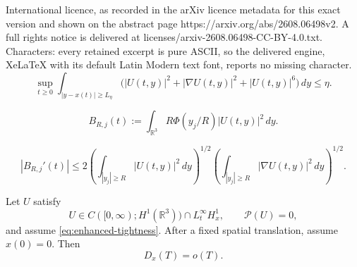 \documentclass[10pt,a4paper]{amsart}
\newcommand{\Pcal}{\mathcal P}
\newcommand{\R}{\mathbb R}
\newcommand{\dd}{\,d}
\begin{document}
International licence, as recorded in the arXiv licence metadata for this exact version and shown on the abstract page https://arxiv.org/abs/2608.06498v2. A full rights notice is delivered at licenses/arxiv-2608.06498-CC-BY-4.0.txt. Characters: every retained excerpt is pure ASCII, so the delivered engine, XeLaTeX with its default Latin Modern text font, reports no missing character.
\begin{equation}\label{eq:enhanced-tightness}
  \sup_{t\ge0}
  \int_{|y-x(t)|\ge L_\eta}
  \bigl(|U(t,y)|^2+|\nabla U(t,y)|^2+|U(t,y)|^6\bigr)\dd y
  \le\eta.
\end{equation}

\begin{equation}\label{eq:localized-center-mass}
  B_{R,j}(t):=\int_{\R^3}R\Phi(y_j/R)|U(t,y)|^2\dd y.
\end{equation}

\begin{equation}\label{eq:Bprime-tail}
  |B_{R,j}'(t)|
  \le2
  \left(\int_{|y_j|\ge R}|U(t,y)|^2\dd y\right)^{1/2}
  \left(\int_{|y_j|\ge R}|\nabla U(t,y)|^2\dd y\right)^{1/2}.
\end{equation}

\begin{lemma}\label{lem:sublinear-drift}
Let $U$ satisfy
\begin{equation*}
  U\in C([0,\infty);H^1(\R^3))\cap L_t^\infty H_x^1,
  \qquad \Pcal(U)=0,
\end{equation*}
and assume \eqref{eq:enhanced-tightness}. After a fixed spatial translation, assume $x(0)=0$. Then
\begin{equation}\label{eq:sublinear-drift}
  D_x(T)=o(T).
\end{equation}
\end{lemma}
\end{document}
